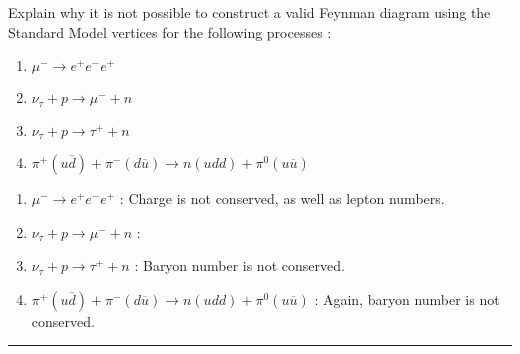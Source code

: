 \begin{problem}{1.3}
Explain why it is not possible to construct a valid Feynman diagram using the Standard Model vertices for the following processes :
\begin{enumerate}[label=(\alph*)]
    \item $\mu^- \to e^+e^-e^+$
    \item $\nu_\tau + p \to \mu^- + n$
    \item $\nu_\tau + p \to \tau^+ + n$
    \item $\pi^+(u\overbar{d})+\pi^-(d\overbar{u}) \to n(udd) + \pi^0(u\overbar{u})$
\end{enumerate}
\end{problem}
\begin{solution}
\begin{enumerate}[label=(\alph*)]
    \item $\mu^- \to e^+e^-e^+$ : Charge is not conserved, as well as lepton numbers.
    \item $\nu_\tau + p \to \mu^- + n$ : 
    \item $\nu_\tau + p \to \tau^+ + n$ : Baryon number is not conserved.
    \item $\pi^+(u\overbar{d})+\pi^-(d\overbar{u}) \to n(udd) + \pi^0(u\overbar{u})$ : Again, baryon number is not conserved.
\end{enumerate}
\end{solution}

\noindent\rule{7in}{1.5pt}


